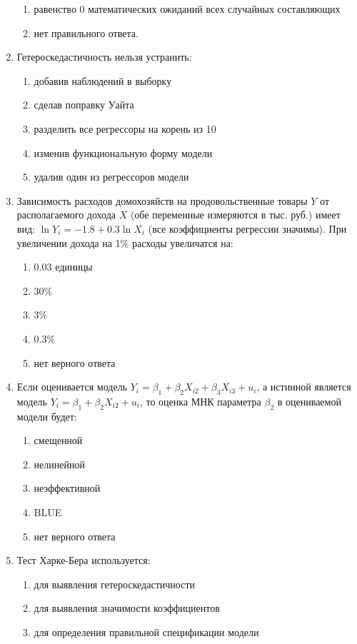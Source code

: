 \begin{enumerate}
\begin{enumerate}
	\item равенство 0 математических ожиданий всех случайных составляющих
	\item нет правильного ответа.
	\end{enumerate}
\item Гетероскедастичность нельзя устранить:
	\begin{enumerate}
	\item добавив наблюдений в выборку
	\item сделав поправку Уайта
	\item разделить все регрессоры на корень из 10
	\item изменив функциональную форму модели
	\item удалив один из регрессоров модели
\end{enumerate}
\item Зависимость расходов домохозяйств на продовольственные товары $Y$ от располагаемого дохода $X$ (обе переменные измеряются в тыс. руб.) имеет вид: $\ln Y_i = -1.8 + 0.3\ln X_i$ (все коэффициенты регрессии значимы). При увеличении дохода на 1\% расходы увеличатся на:
	\begin{enumerate}
	\item 0.03 единицы
	\item 30\%
	\item 3\%
	\item 0.3\%
	\item нет верного ответа
	\end{enumerate}
\item Если оценивается модель $Y_i = \beta_1 + \beta_2 X_{i2} + \beta_3 X_{i3} + u_i$, а истинной является модель $Y_i = \beta_1 + \beta_2 X_{i2} + u_i$, то оценка МНК параметра $\beta_2$ в оцениваемой модели будет:
	\begin{enumerate}
	\item смещенной
	\item нелинейной
	\item неэффективной
	\item BLUE
	\item нет верного ответа
	\end{enumerate}
\item Тест Харке-Бера  используется:
	\begin{enumerate}
	\item для выявления гетероскедастичности
	\item для выявления значимости коэффициентов
	\item для определения правильной спецификации модели 

\end{enumerate}
\end{enumerate}
